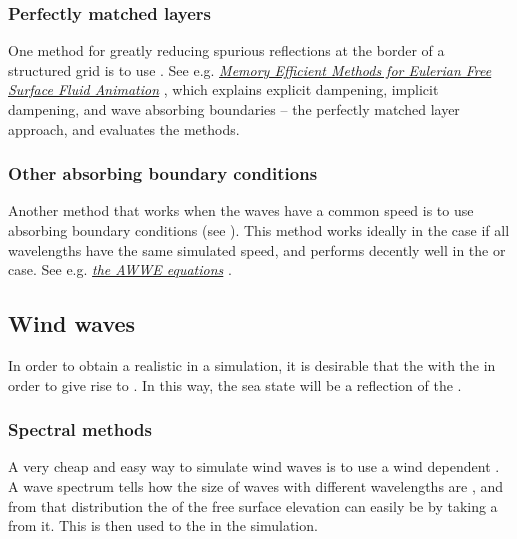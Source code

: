\subsubsection{Perfectly matched layers}

One method for greatly reducing spurious reflections at the border of a structured grid is to use . See e.g. \textit{\href{http://liu.diva-portal.org/smash/get/diva2:359805/FULLTEXT01}{Memory Efficient Methods for Eulerian Free Surface Fluid Animation}} \citep{temp}, which explains explicit dampening, implicit dampening, and wave absorbing boundaries -- the perfectly matched layer approach, and evaluates the methods.

\subsubsection{Other absorbing boundary conditions}

Another method that works when the waves have a common speed is to use absorbing boundary conditions (see \citep{temp}). This method works ideally in the  case if all wavelengths have the same simulated speed, and performs decently well in the  or  case. See e.g. \textit{\href{http://www.ce.ncsu.edu/centers/cmg/AWWE/}{the AWWE equations}} \citep{temp}.
\subsection{Wind waves}

In order to obtain a realistic  in a simulation, it is desirable that the  \interacts with the \wind in order to give rise to . In this way, the sea state will be a reflection of the .

\subsubsection{Spectral methods}

A very cheap and easy way to simulate wind waves is to use a wind dependent . A wave spectrum tells how the size of waves with different wavelengths are \distributed, and from that distribution the  of the free surface elevation can easily be \generated by taking a \random \sample from it. This is then used to \initialize the  in the simulation.

